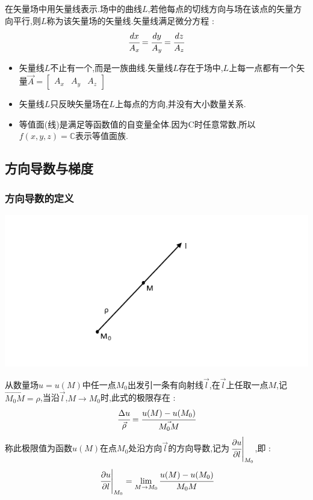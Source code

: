 \documentclass[UTF8,12pt]{ctexbook}
\newcommand{\limNormal}[1]{\lim\limits_{#1}}
\newcommand{\defFunction}[1]{f(#1)}
\newcommand{\mathConstant}{\mathbb{C}}
\newcommand{\directionDerivative}[3]{\left.\cfrac{\partial #1}{\partial #2}\right|_{#3}}
\begin{document}
{{{{{      在矢量场中用矢量线表示.场中的曲线$L$,若他每点的切线方向与场在该点的矢量方向平行,则$L$称为该矢量场的矢量线.矢量线满足微分方程 :
      $$
        \cfrac{dx}{A_x} = \cfrac{dy}{A_y} = \cfrac{dz}{A_z}
      $$

      \begin{itemize}
        \item 矢量线$L$不止有一个,而是一族曲线.矢量线$L$存在于场中,$L$上每一点都有一个矢量$\vec{A} = \begin{bmatrix}
                  A_x & A_y & A_z
                \end{bmatrix}$
        \item 矢量线$L$只反映矢量场在$L$上每点的方向,并没有大小数量关系.
        \item 等值面(线)是满足等函数值的自变量全体.因为C时任意常数,所以$\defFunction{x,y,z} = \mathConstant$表示等值面族.
      \end{itemize}
    }%

  }%

  \subsection{方向导数与梯度}{

    \subsubsection{方向导数的定义}{
      \includegraphics{resources/directionDerivative1.png}

      从数量场$u= u(M)$中任一点$M_0$出发引一条有向射线$\vec{l}$,在$\vec{l}$上任取一点$M$,记$\vec{M_0M} = \rho$,当沿$\vec{l}$,$M \to M_0$时,此式的极限存在 :
      $$
        \cfrac{\Delta u}{\vec{\rho}} = \cfrac{u(M) - u(M_0)}{\vec{M_0M}}
      $$
      称此极限值为函数$u(M)$在点$M_0$处沿方向$\vec{l}$的方向导数,记为$\directionDerivative{u}{l}{M_0}$,即 :
      $$
        \directionDerivative{u}{l}{M_0} = \limNormal{M \to M_0}\cfrac{u(M) - u(M_0)}{M_0M}
      $$

}}}}}
\end{document}
